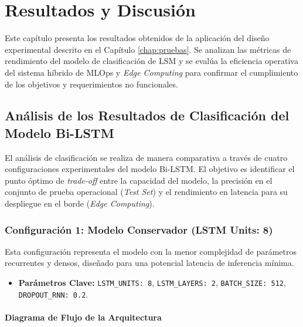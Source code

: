 \chapter{Resultados y Discusión}
\label{chap:resultados}

Este capítulo presenta los resultados obtenidos de la aplicación del diseño experimental descrito en el Capítulo \ref{chap:pruebas}. Se analizan las métricas de rendimiento del modelo de clasificación de LSM y se evalúa la eficiencia operativa del sistema híbrido de MLOps y \textit{Edge Computing} para confirmar el cumplimiento de los objetivos y requerimientos no funcionales.

\section{Análisis de los Resultados de Clasificación del Modelo Bi-LSTM}
\label{sec:analisis_clasificacion}

El análisis de clasificación se realiza de manera comparativa a través de cuatro configuraciones experimentales del modelo Bi-LSTM. El objetivo es identificar el punto óptimo de \textit{trade-off} entre la capacidad del modelo, la precisión en el conjunto de prueba operacional (\textit{Test Set}) y el rendimiento en latencia para su despliegue en el borde (\textit{Edge Computing}).

\subsection{Configuración 1: Modelo Conservador (LSTM Units: 8)}
\label{sec:configuracion_1}

Esta configuración representa el modelo con la menor complejidad de parámetros recurrentes y densos, diseñado para una potencial latencia de inferencia mínima.

\begin{itemize}
    \item \textbf{Parámetros Clave:} \lstinline|LSTM_UNITS: 8|, \lstinline|LSTM_LAYERS: 2|, \lstinline|BATCH_SIZE: 512|, \lstinline|DROPOUT_RNN: 0.2|.
\end{itemize}

\subsubsection{Diagrama de Flujo de la Arquitectura}
\label{sec:arquitectura_c1}

